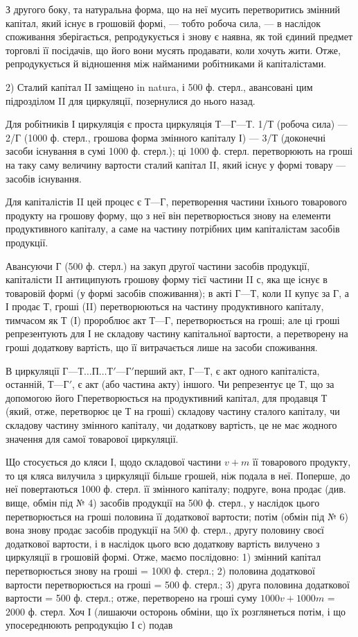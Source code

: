 З другого боку, та натуральна форма, що на неї мусить перетворитись
змінний капітал, який існує в грошовій формі, — тобто робоча сила, —
в наслідок споживання зберігається, репродукується і знову є наявна,
як той єдиний предмет торговлі її посідачів, що його вони мусять продавати,
коли хочуть жити. Отже, репродукується й відношення між найманими
робітниками й капіталістами.

2) Сталий капітал II заміщено in natura, і 500 ф. стерл., авансовані
цим підрозділом II для циркуляції, позернулися до нього назад.

Для робітників І циркуляція є проста циркуляція $Т — Г — Т$. 1/Т (робоча
сила) — 2/Г (1000 ф. стерл., грошова форма змінного капіталу І) — 3/Т
(доконечні засоби існування в сумі 1000 ф. стерл.); ці 1000 ф. стерл.
перетворюють на гроші на таку саму величину вартости сталий капітал II,
який існує у формі товару — засобів існування.

Для капіталістів II цей процес є $Т — Г$, перетворення частини їхнього
товарового продукту на грошову форму, що з неї він перетворюється
знову на елементи продуктивного капіталу, а саме на частину потрібних
цим капіталістам засобів продукції.

Авансуючи Г (500 ф. стерл.) на закуп другої частини засобів продукції,
капіталісти II антиципують грошову форму тієї частини II с, яка
ще існує в товаровій формі (у формі засобів споживання); в акті $Г — Т$,
коли II купує за Г, а І продає Т, гроші (II) перетворюються на частину
продуктивного капіталу, тимчасом як Т (І) пророблює акт $Т — Г$, перетворюється
на гроші; але ці гроші репрезентують для І не складову частину
капітальної вартости, а перетворену на гроші додаткову вартість, що її
витрачається лише на засоби споживання.

В циркуляції $Г — Т\dots{} П\dots{} Т' — Г' п$ерший акт, $Г — Т$, є акт одного капіталіста,
останній, $Т — Г'$, є акт (або частина акту) іншого. Чи репрезентує
це Т, що за допомогою його $Г п$еретворюється на продуктивний капітал,
для продавця Т (який, отже, перетворює це Т на гроші) складову частину
сталого капіталу, чи складову частину змінного капіталу, чи додаткову
вартість, це не має жодного значення для самої товарової циркуляції.

Що стосується до кляси І, щодо складової частини $v + m$ її товарового
продукту, то ця кляса вилучила з циркуляції більше грошей, ніж подала
в неї. Поперше, до неї повертаються 1000 ф. стерл. її змінного капіталу;
подруге, вона продає (див. вище, обмін під № 4) засобів продукції
на 500 ф. стерл., у наслідок цього перетворюється на гроші половина
її додаткової вартости; потім (обмін під № 6) вона знову продає засобів
продукції на 500 ф. стерл., другу половину своєї додаткової вартости,
і в наслідок цього всю додаткову вартість вилучено з циркуляції в грошовій
формі. Отже, маємо послідовно: 1) змінний капітал перетворюється
знову на гроші = 1000 ф. стерл.; 2) половина додаткової вартости перетворюється
на гроші = 500 ф. стерл.; 3) друга половина додаткової
вартости = 500 ф. стерл.; отже, перетворено на гроші суму
$1000 v + 1000 m$ = 2000 ф. стерл. Хоч І (лишаючи осторонь обміни,
що їх розглянеться потім, і що упосереднюють репродукцію І с) подав
\parbreak{}  %
